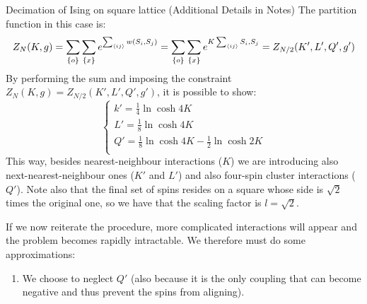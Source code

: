 \documentclass[../../Main/Main.tex]{subfiles}
\begin{document}
\begin{example}{Decimation of Ising on square lattice (Additional Details in Notes)}{}
The partition function in this case is:
\begin{equation*}
  Z_N (K,g) = \sum_{\{ o \}  }^{} \sum_{\{ x \}  }^{}   e^{\sum_{\expval{ij}
  }^{} w (S_i,S_j)  } = \sum_{\{ o \}  }^{} \sum_{\{ x \}  }^{}   e^{K \sum_{\expval{ij}}^{} S_i,S_j }
  =Z_{N/2} (K',L',Q',g')
\end{equation*}
By performing the sum and imposing the constraint \( Z_N  (K,g) = Z_{N/2} (K',L',Q',g') \), it is possible to show:
\begin{equation*}
  \begin{cases}
   k' = \frac{1}{4} \ln{\cosh 4 K} \\
   L' = \frac{1}{8} \ln{\cosh 4 K} \\
   Q' = \frac{1}{8} \ln{\cosh 4 K} - \frac{1}{2} \ln{\cosh 2 K}\\
  \end{cases}
\end{equation*}
This way, besides nearest-neighbour interactions (\( K \)) we are introducing also next-nearest-neighbour ones (\( K' \)  and \( L' \)) and also four-spin cluster interactions (\( Q' \)).
Note also that the final set of spins resides on a square whose side is \( \sqrt{2}  \)  times the original one, so we have that the scaling factor is \( l = \sqrt{2}  \).

If we now reiterate the procedure, more complicated interactions will appear and the problem becomes rapidly intractable. We therefore must do some approximations:

\begin{enumerate}

\item  We choose to neglect \( Q' \) (also because it is the only coupling that can become negative and thus prevent the spins from aligning).


\end{enumerate}
\end{example}
\end{document}

